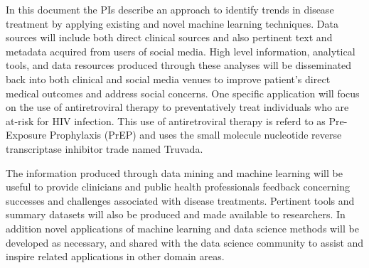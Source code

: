 


In this document the PIs describe an approach to identify trends in disease treatment by applying existing and novel machine learning techniques. Data sources will include both direct clinical sources and also pertinent text and metadata acquired from users of social media. High level information, analytical tools, and data resources produced through these analyses will be disseminated back into both clinical and social media venues to improve patient's direct medical outcomes and address social concerns. One specific application will focus on the use of antiretroviral therapy to preventatively treat individuals who are at-risk for HIV infection. This use of antiretroviral therapy is referd to as Pre-Exposure Prophylaxis (PrEP) and uses the small molecule nucleotide reverse transcriptase inhibitor trade named Truvada.

The information produced through data mining and machine learning will be useful to provide clinicians and public health professionals feedback concerning successes and challenges associated with disease treatments. Pertinent tools and summary datasets will also be produced and made available to researchers. In addition novel applications of machine learning and data science methods will be developed as necessary, and shared with the data science community to assist and inspire related applications in other domain areas.


